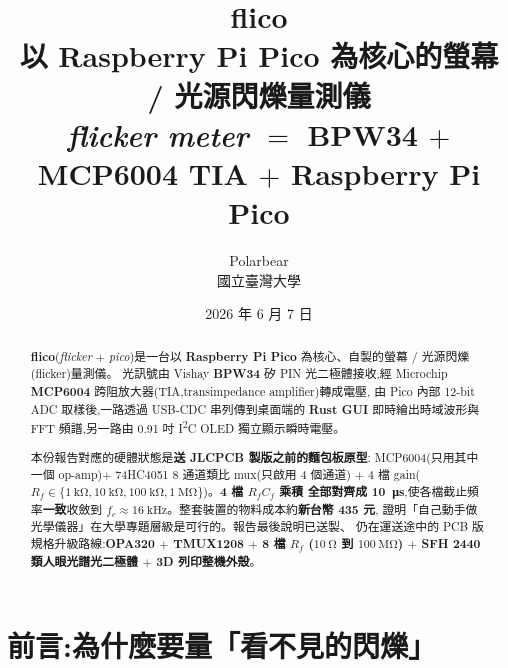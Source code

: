 \documentclass[12pt,a4paper]{article}
\title{\bfseries flico \\[4pt]
       \large 以 Raspberry Pi Pico 為核心的螢幕 / 光源閃爍量測儀\\[2pt]
       \normalsize {\it flicker meter} \(=\) BPW34 \(+\) MCP6004 TIA \(+\) Raspberry Pi Pico}
\author{Polarbear\\ \normalsize 國立臺灣大學}
\date{2026 年 6 月 7 日}
\begin{document}
\maketitle
\thispagestyle{fancy}

\begin{abstract}
	\noindent\textbf{flico}(\textit{flicker} \(+\) \textit{pico})是一台以
	\textbf{Raspberry Pi Pico} 為核心、自製的螢幕 / 光源閃爍(flicker)量測儀。
	光訊號由 Vishay \textbf{BPW34} 矽 PIN 光二極體接收,經 Microchip
	\textbf{MCP6004} 跨阻放大器(TIA,transimpedance amplifier)轉成電壓,
	由 Pico 內部 12-bit ADC 取樣後,一路透過 USB-CDC 串列傳到桌面端的 \textbf{Rust GUI}
	即時繪出時域波形與 FFT 頻譜,另一路由 0.91 吋 I\textsuperscript{2}C OLED
	獨立顯示瞬時電壓。

	\medskip
	本份報告對應的硬體狀態是\textbf{送 JLCPCB 製版之前的麵包板原型}:
	MCP6004(只用其中一個 op-amp)\(+\) 74HC4051 8 通道類比 mux(只啟用 4 個通道)
	\(+\) 4 檔 gain(\(R_f \in \{\SI{1}{\kilo\ohm}, \SI{10}{\kilo\ohm},
	\SI{100}{\kilo\ohm}, \SI{1}{\mega\ohm}\}\))。\textbf{4 檔 \(R_f C_f\) 乘積
		全部對齊成 \SI{10}{\micro\second}},使各檔截止頻率\textbf{一致}收斂到
	\(f_c \approx \SI{16}{\kilo\hertz}\)。整套裝置的物料成本約\textbf{新台幣 435 元},
	證明「自己動手做光學儀器」在大學專題層級是可行的。報告最後說明已送製、
	仍在運送途中的 PCB 版規格升級路線:\textbf{OPA320 \(+\) TMUX1208 \(+\) 8 檔
		\(R_f\) (\(\SI{10}{\ohm}\) 到 \(\SI{100}{\mega\ohm}\)) \(+\) SFH 2440
		類人眼光譜光二極體 \(+\) 3D 列印整機外殼}。
\end{abstract}

\section{前言:為什麼要量「看不見的閃爍」}
\end{document}
